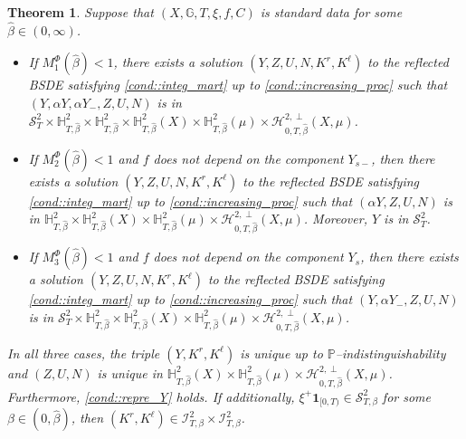 \documentclass[10pt]{article} %
\newtheorem{theorem}{Theorem}[section]
\newcommand\cH{\mathcal H}
\newcommand\cI{\mathcal I}
\newcommand\cS{\mathcal S}
\def \G{\mathbb{G}}
\def \H{\mathbb{H}}
\def \P{\mathbb{P}}
\newcommand{\1}{\mathbf{1}}
\begin{document}
\begin{theorem}\label{thm::main}
	Suppose that $(X,\G,T,\xi,f,C)$ is standard data for some $\hat\beta \in (0,\infty)$.	
	\begin{itemize}
	\item[$(i)$] If $M_1^\Phi(\hat\beta) < 1$, there exists a solution $(Y,Z,U,N,K^r,K^\ell)$ to the reflected {\rm BSDE} satisfying \ref{cond::integ_mart} up to \ref{cond::increasing_proc} such that $(Y,\alpha Y,\alpha Y_-,Z,U,N)$ is in $\cS^2_T \times \H^2_{T,\hat\beta} \times \H^2_{T,\hat\beta} \times \H^2_{T,\hat\beta}(X) \times \H^2_{T,\hat\beta}(\mu) \times \cH^{2,\perp}_{0,T,\hat\beta}(X,\mu)$. 
	
	\item[$(ii)$] If $M_2^\Phi(\hat\beta) < 1$ and $f$ does not depend on the component $Y_{s-}$, then there exists a solution $(Y,Z,U,N,K^r,K^\ell)$ to the reflected {\rm BSDE} satisfying \ref{cond::integ_mart} up to \ref{cond::increasing_proc} such that $(\alpha Y,Z,U,N)$ is in $\H^2_{T,\hat\beta} \times \H^2_{T,\hat\beta}(X) \times \H^2_{T,\hat\beta}(\mu) \times \cH^{2,\perp}_{0,T,\hat\beta}(X,\mu)$. Moreover, $Y$ is in $\cS^2_T$.
	
	\item[$(iii)$] If $M_3^\Phi(\hat\beta) < 1$ and $f$ does not depend on the component $Y_s$, then there exists a solution $(Y,Z,U,N,K^r,K^\ell)$ to the reflected {\rm BSDE} satisfying \ref{cond::integ_mart} up to \ref{cond::increasing_proc} such that $(Y,\alpha Y_-,Z,U,N)$ is in $\cS^2_T \times \H^2_{T,\hat\beta} \times \H^2_{T,\hat\beta}(X) \times \H^2_{T,\hat\beta}(\mu) \times \cH^{2,\perp}_{0,T,\hat\beta}(X,\mu)$. 
	\end{itemize}
	In all three cases, the triple $(Y,K^r,K^\ell)$ is unique up to $\P$--indistinguishability and $(Z,U,N)$ is unique in $\H^2_{T,\hat\beta}(X) \times \H^2_{T,\hat\beta}(\mu) \times \cH^{2,\perp}_{0,T,\hat\beta}(X,\mu)$. Furthermore, \ref{cond::repre_Y} holds. 
	If additionally, $\xi^+\mathbf{1}_{[0,T)} \in \cS^2_{T,\beta}$ for some $\beta \in (0,\hat\beta)$, then $(K^r,K^\ell) \in \cI^2_{T,\beta} \times \cI^2_{T,\beta}$.
\end{theorem}
\end{document}
